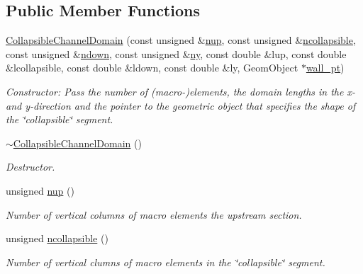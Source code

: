 \subsection*{Public Member Functions}
\begin{DoxyCompactItemize}
\item 
\hyperlink{classoomph_1_1CollapsibleChannelDomain_a85e64b812b36155302407269d77dc6b3}{Collapsible\+Channel\+Domain} (const unsigned \&\hyperlink{classoomph_1_1CollapsibleChannelDomain_a7e098bcffc76332af4ca220701fd32e2}{nup}, const unsigned \&\hyperlink{classoomph_1_1CollapsibleChannelDomain_a59dd9d4001621752439ad95ceb8daa1b}{ncollapsible}, const unsigned \&\hyperlink{classoomph_1_1CollapsibleChannelDomain_a0e1c69ac122606e4f883e96b51989d9f}{ndown}, const unsigned \&\hyperlink{classoomph_1_1CollapsibleChannelDomain_a62e15782984f3d5e10ba44a6d8ad06ee}{ny}, const double \&lup, const double \&lcollapsible, const double \&ldown, const double \&ly, Geom\+Object $\ast$\hyperlink{classoomph_1_1CollapsibleChannelDomain_a0a98c02b478d61d2cd4c899d0d37344a}{wall\+\_\+pt})
\begin{DoxyCompactList}\small\item\em Constructor\+: Pass the number of (macro-\/)elements, the domain lengths in the x-\/ and y-\/direction and the pointer to the geometric object that specifies the shape of the \char`\"{}collapsible\char`\"{} segment. \end{DoxyCompactList}\item 
\hyperlink{classoomph_1_1CollapsibleChannelDomain_a22469fc91a872e6252133af6e97d6e48}{$\sim$\+Collapsible\+Channel\+Domain} ()
\begin{DoxyCompactList}\small\item\em Destructor. \end{DoxyCompactList}\item 
unsigned \hyperlink{classoomph_1_1CollapsibleChannelDomain_a7e098bcffc76332af4ca220701fd32e2}{nup} ()
\begin{DoxyCompactList}\small\item\em Number of vertical columns of macro elements the upstream section. \end{DoxyCompactList}\item 
unsigned \hyperlink{classoomph_1_1CollapsibleChannelDomain_a59dd9d4001621752439ad95ceb8daa1b}{ncollapsible} ()
\begin{DoxyCompactList}\small\item\em Number of vertical clumns of macro elements in the \char`\"{}collapsible\char`\"{} segment. \end{DoxyCompactList}\item 

\end{DoxyCompactItemize}
